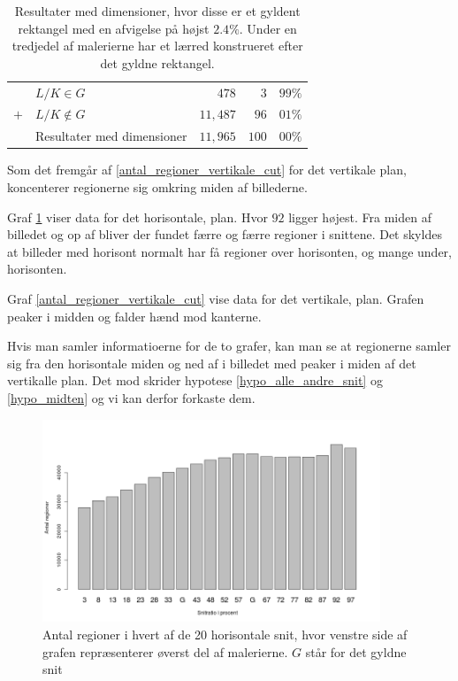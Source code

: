 {\begin{table}[H]
    \centering
    \begin{tabular}{r@{\ \ }p{14em}r|r@{.}l}
            & $L/K \in G$                  &    $478$ &   $3$ & $99\%$ \\
        $+$ & $L/K \notin G$               & $11,487$ &  $96$ & $01\%$ \\\hline
            & Resultater med dimensioner   & $11,965$ & $100$ & $00\%$
    \end{tabular}
    \caption[]{Resultater med dimensioner, hvor disse er et gyldent
    rektangel med en afvigelse på højst $2.4\%$. Under en tredjedel af
    malerierne har et lærred konstrueret efter det gyldne rektangel.}
    \label{tabel_real_dimensions}
\end{table}

Som det fremgår af \ref{antal_regioner_vertikale_cut} for det vertikale
plan, koncenterer regionerne sig omkring miden af billederne.

Graf \ref{antal_regioner_horisontale_cut} viser data for det
horisontale, plan. Hvor $92$ ligger højest. Fra miden af billedet og op
af bliver der fundet færre og færre regioner i snittene. Det skyldes at
billeder med horisont normalt har få regioner over horisonten, og mange
under, horisonten.

Graf \ref{antal_regioner_vertikale_cut} vise data for det vertikale,
plan. Grafen peaker i midden og falder hænd mod kanterne.

Hvis man samler informatioerne for de to grafer, kan man se at
regionerne samler sig fra den horisontale miden og ned af i billedet med
peaker i miden af det vertikalle plan. Det mod skrider hypotese
\ref{hypo_alle_andre_snit} og \ref{hypo_midten} og vi kan derfor
forkaste dem.

\begin{figure}[h!]
	\begin{center}
		\includegraphics[width=0.9\textwidth]{afsnit/resultater/billeder/cut2cut3eatsperratio.png}
	\end{center}
	\caption{Antal regioner i hvert af de 20 horisontale snit, hvor venstre side af grafen repræsenterer øverst del af malerierne. $G$ står for det gyldne snit}
	\label{antal_regioner_horisontale_cut}
\end{figure}

}
